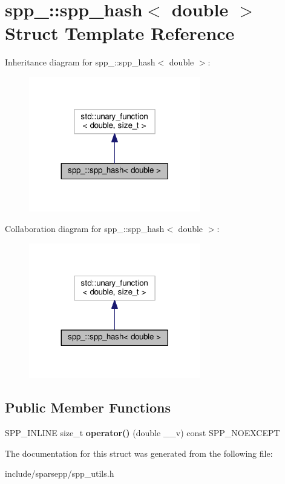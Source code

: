 \hypertarget{structspp___1_1spp__hash_3_01double_01_4}{}\section{spp\+\_\+\+:\+:spp\+\_\+hash$<$ double $>$ Struct Template Reference}
\label{structspp___1_1spp__hash_3_01double_01_4}


Inheritance diagram for spp\+\_\+\+:\+:spp\+\_\+hash$<$ double $>$\+:\nopagebreak
\begin{figure}[H]
\begin{center}
\leavevmode
\includegraphics[width=212pt]{structspp___1_1spp__hash_3_01double_01_4__inherit__graph}
\end{center}
\end{figure}


Collaboration diagram for spp\+\_\+\+:\+:spp\+\_\+hash$<$ double $>$\+:\nopagebreak
\begin{figure}[H]
\begin{center}
\leavevmode
\includegraphics[width=212pt]{structspp___1_1spp__hash_3_01double_01_4__coll__graph}
\end{center}
\end{figure}
\subsection*{Public Member Functions}
\begin{DoxyCompactItemize}
\item 
S\+P\+P\+\_\+\+I\+N\+L\+I\+NE size\+\_\+t {\bfseries operator()} (double \+\_\+\+\_\+v) const S\+P\+P\+\_\+\+N\+O\+E\+X\+C\+E\+PT\hypertarget{structspp___1_1spp__hash_3_01double_01_4_a078ddea3f438970670a64b5e9125046c}{}\label{structspp___1_1spp__hash_3_01double_01_4_a078ddea3f438970670a64b5e9125046c}

\end{DoxyCompactItemize}


The documentation for this struct was generated from the following file\+:\begin{DoxyCompactItemize}
\item 
include/sparsepp/spp\+\_\+utils.\+h\end{DoxyCompactItemize}
